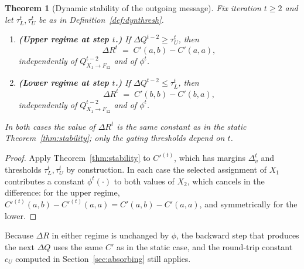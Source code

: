 \documentclass[letterpaper]{article} %
\newtheorem{theorem}{Theorem}[section]
\theoremstyle{definition}
\theoremstyle{remark}
\begin{document}
\begin{theorem}[Dynamic stability of the outgoing message]\label{thm:dynstability}
Fix iteration $t \geq 2$ and let $\tau_L^t, \tau_U^t$ be as in Definition~\ref{def:dynthresh}.
\begin{enumerate}
    \item \textbf{(Upper regime at step $t$.)} If $\Delta Q^{t-2} \geq \tau_U^t$, then
    \[
        \Delta R^t \;=\; C'(a,b) - C'(a,a),
    \]
    independently of $Q^{t-2}_{X_1 \to F_{12}}$ and of $\phi^t$.
    \item \textbf{(Lower regime at step $t$.)} If $\Delta Q^{t-2} \leq \tau_L^t$, then
    \[
        \Delta R^t \;=\; C'(b,b) - C'(b,a),
    \]
    independently of $Q^{t-2}_{X_1 \to F_{12}}$ and of $\phi^t$.
\end{enumerate}
In both cases the value of $\Delta R^t$ is the same constant as in the static Theorem~\ref{thm:stability}; only the gating thresholds depend on $t$.
\end{theorem}
\begin{proof}
Apply Theorem~\ref{thm:stability} to $C'^{(t)}$, which has margins $\Delta^t_v$ and thresholds $\tau_L^t, \tau_U^t$ by construction.  In each case the selected assignment of $X_1$ contributes a constant $\phi^t(\cdot)$ to both values of $X_2$, which cancels in the difference: for the upper regime, $C'^{(t)}(a,b) - C'^{(t)}(a,a) = C'(a,b) - C'(a,a)$, and symmetrically for the lower. \qedhere
\end{proof}
Because $\Delta R$ in either regime is unchanged by $\phi$, the backward step that produces the next $\Delta Q$ uses the same $C'$ as in the static case, and the round-trip constant $c_U$ computed in Section~\ref{sec:absorbing} still applies.
\end{document}
